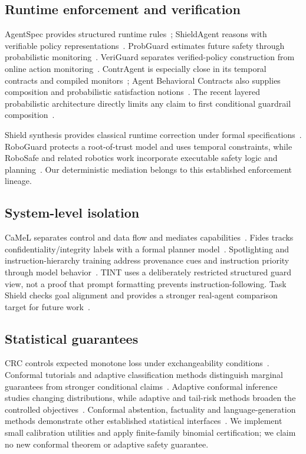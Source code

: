 ﻿\documentclass[lettersize,journal]{IEEEtran}
\begin{document}
\subsection{Runtime enforcement and verification}
AgentSpec provides structured runtime rules~\cite{arxiv250318666}; ShieldAgent
reasons with verifiable policy representations~\cite{arxiv250322738}.
ProbGuard estimates future safety through probabilistic
monitoring~\cite{arxiv250800500}. VeriGuard separates verified-policy
construction from online action monitoring~\cite{arxiv251005156}.
ContrAgent is especially close in its temporal contracts and compiled
monitors~\cite{arxiv260918128}; Agent Behavioral Contracts also supplies
composition and probabilistic satisfaction notions~\cite{arxiv260222302}.
The recent layered probabilistic architecture directly limits any claim to
first conditional guardrail composition~\cite{arxiv260518672}.

Shield synthesis provides classical runtime correction under formal
specifications~\cite{arxiv150102573,arxiv170808611,arxiv190805402,arxiv240604184}.
RoboGuard protects a root-of-trust model and uses temporal constraints, while
RoboSafe and related robotics work incorporate executable safety logic and
planning~\cite{arxiv250307885,arxiv251221220,arxiv250315707,arxiv260223719}.
Our deterministic mediation belongs to this established enforcement lineage.

\subsection{System-level isolation}
CaMeL separates control and data flow and mediates
capabilities~\cite{arxiv250318813}. Fides tracks confidentiality/integrity
labels with a formal planner model~\cite{arxiv250523643}. Spotlighting and
instruction-hierarchy training address provenance cues and instruction
priority through model behavior~\cite{arxiv240314720,arxiv240413208}.
TINT uses a deliberately restricted structured guard view, not a proof that
prompt formatting prevents instruction-following. Task Shield checks goal
alignment and provides a stronger real-agent comparison target for future
work~\cite{arxiv241216682}.

\subsection{Statistical guarantees}
CRC controls expected monotone loss under exchangeability
conditions~\cite{arxiv220802814}. Conformal tutorials and adaptive
classification methods distinguish marginal guarantees from stronger
conditional claims~\cite{arxiv210707511,arxiv200602544}.
Adaptive conformal inference studies changing distributions, while adaptive
and tail-risk methods broaden the controlled objectives~\cite{arxiv210600170,arxiv240617819,arxiv250220285}.
Conformal abstention, factuality and language-generation methods demonstrate
other established statistical interfaces~\cite{arxiv240501563,arxiv240210978,arxiv230610193,arxiv230518404,arxiv240301216}.
We implement small calibration utilities and apply finite-family binomial
certification; we claim no new conformal theorem or adaptive safety guarantee.
\end{document}
